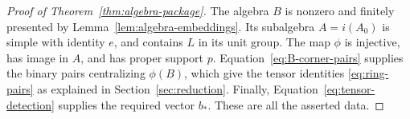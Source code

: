 \begin{proof}[Proof of Theorem~\ref{thm:algebra-package}]
The algebra \(B\) is nonzero and finitely presented by
Lemma~\ref{lem:algebra-embeddings}.  Its subalgebra \(A=i(A_0)\) is
simple with identity \(e\), and contains \(L\) in its unit
group.  The map \(\phi\) is injective, has image in \(A\), and has
proper support \(p\).  Equation~\eqref{eq:B-corner-pairs} supplies
the binary pairs centralizing \(\phi(B)\), which give the tensor identities
\eqref{eq:ring-pairs} as explained in Section~\ref{sec:reduction}. Finally,
Equation~\eqref{eq:tensor-detection} supplies the required vector
\(b_*\).  These are all the asserted data.
\end{proof}
